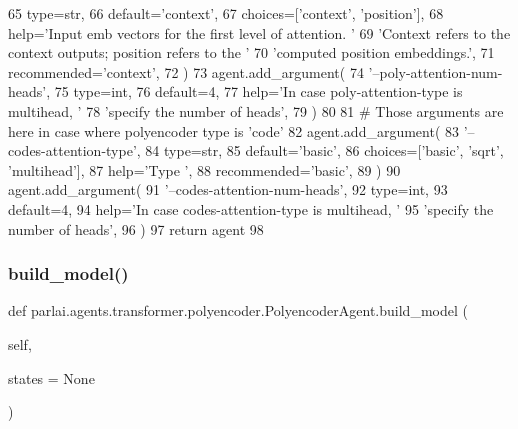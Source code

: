 \begin{DoxyCode}
65             type=str,
66             default=\textcolor{stringliteral}{'context'},
67             choices=[\textcolor{stringliteral}{'context'}, \textcolor{stringliteral}{'position'}],
68             help=\textcolor{stringliteral}{'Input emb vectors for the first level of attention. '}
69             \textcolor{stringliteral}{'Context refers to the context outputs; position refers to the '}
70             \textcolor{stringliteral}{'computed position embeddings.'},
71             recommended=\textcolor{stringliteral}{'context'},
72         )
73         agent.add\_argument(
74             \textcolor{stringliteral}{'--poly-attention-num-heads'},
75             type=int,
76             default=4,
77             help=\textcolor{stringliteral}{'In case poly-attention-type is multihead, '}
78             \textcolor{stringliteral}{'specify the number of heads'},
79         )
80 
81         \textcolor{comment}{# Those arguments are here in case where polyencoder type is 'code'}
82         agent.add\_argument(
83             \textcolor{stringliteral}{'--codes-attention-type'},
84             type=str,
85             default=\textcolor{stringliteral}{'basic'},
86             choices=[\textcolor{stringliteral}{'basic'}, \textcolor{stringliteral}{'sqrt'}, \textcolor{stringliteral}{'multihead'}],
87             help=\textcolor{stringliteral}{'Type '},
88             recommended=\textcolor{stringliteral}{'basic'},
89         )
90         agent.add\_argument(
91             \textcolor{stringliteral}{'--codes-attention-num-heads'},
92             type=int,
93             default=4,
94             help=\textcolor{stringliteral}{'In case codes-attention-type is multihead, '}
95             \textcolor{stringliteral}{'specify the number of heads'},
96         )
97         \textcolor{keywordflow}{return} agent
98 
\end{DoxyCode}
\mbox{\label{classparlai_1_1agents_1_1transformer_1_1polyencoder_1_1PolyencoderAgent_a50c59f1b745560d8883c1f9b65dce10a}} 
\subsubsection{\texorpdfstring{build\+\_\+model()}{build\_model()}}
{\footnotesize\ttfamily def parlai.\+agents.\+transformer.\+polyencoder.\+Polyencoder\+Agent.\+build\+\_\+model (\begin{DoxyParamCaption}\item[{}]{self,  }\item[{}]{states = {\ttfamily None} }\end{DoxyParamCaption})}

